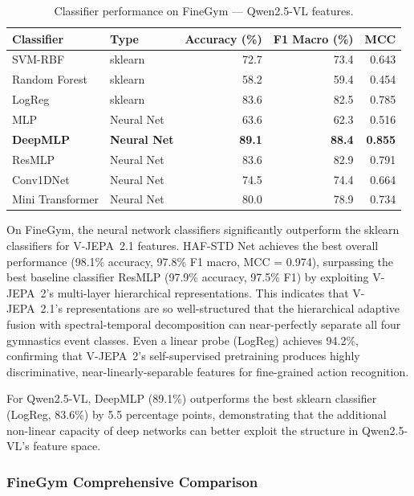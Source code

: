 \begin{table}[H]
\centering
\caption{Classifier performance on FineGym --- Qwen2.5-VL features.}
\label{tab:fg_qwen_clf}
\begin{tabular}{llrrr}
\toprule
\textbf{Classifier} & \textbf{Type} & \textbf{Accuracy (\%)} & \textbf{F1 Macro (\%)} & \textbf{MCC} \\
\midrule
SVM-RBF       & sklearn & 72.7 & 73.4 & 0.643 \\
Random Forest & sklearn & 58.2 & 59.4 & 0.454 \\
LogReg        & sklearn & 83.6 & 82.5 & 0.785 \\
\midrule
MLP           & Neural Net & 63.6 & 62.3 & 0.516 \\
\textbf{DeepMLP} & \textbf{Neural Net} & \textbf{89.1} & \textbf{88.4} & \textbf{0.855} \\
ResMLP        & Neural Net & 83.6 & 82.9 & 0.791 \\
Conv1DNet     & Neural Net & 74.5 & 74.4 & 0.664 \\
Mini Transformer & Neural Net & 80.0 & 78.9 & 0.734 \\
\bottomrule
\end{tabular}
\end{table}

On FineGym, the neural network classifiers significantly outperform the sklearn classifiers for V-JEPA~2.1 features. HAF-STD Net achieves the best overall performance (98.1\% accuracy, 97.8\% F1 macro, MCC = 0.974), surpassing the best baseline classifier ResMLP (97.9\% accuracy, 97.5\% F1) by exploiting V-JEPA~2's multi-layer hierarchical representations. This indicates that V-JEPA~2.1's representations are so well-structured that the hierarchical adaptive fusion with spectral-temporal decomposition can near-perfectly separate all four gymnastics event classes. Even a linear probe (LogReg) achieves 94.2\%, confirming that V-JEPA~2's self-supervised pretraining produces highly discriminative, near-linearly-separable features for fine-grained action recognition.

For Qwen2.5-VL, DeepMLP (89.1\%) outperforms the best sklearn classifier (LogReg, 83.6\%) by 5.5 percentage points, demonstrating that the additional non-linear capacity of deep networks can better exploit the structure in Qwen2.5-VL's feature space.

\subsubsection{FineGym Comprehensive Comparison}

